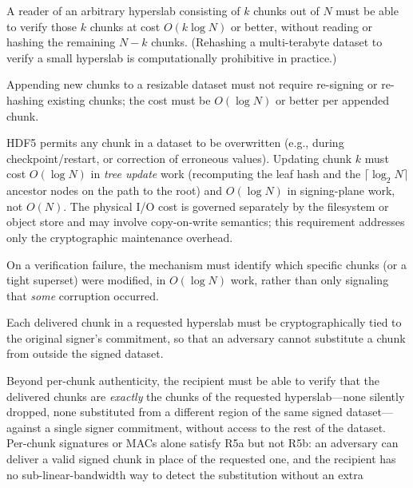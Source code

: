 \documentclass[11pt]{article}
\begin{document}
\begin{description}[nosep]
  \item[R1: Sub-dataset partial verification.]
    A reader of an arbitrary hyperslab consisting of $k$ chunks out of $N$
    must be able to verify those $k$ chunks at cost $O(k\log N)$ or better,
    without reading or hashing the remaining $N-k$ chunks. (Rehashing a
    multi-terabyte dataset to verify a small hyperslab is computationally
    prohibitive in practice.)
  \item[R2: Incremental extension.]
    Appending new chunks to a resizable dataset must not require re-signing
    or re-hashing existing chunks; the cost must be $O(\log N)$ or better
    per appended chunk.
  \item[R3: In-place chunk update.]
    HDF5 permits any chunk in a dataset to be overwritten (e.g., during
    checkpoint/restart, or correction of erroneous values). Updating chunk
    $k$ must cost $O(\log N)$ in \emph{tree update} work (recomputing the
    leaf hash and the $\lceil\log_2 N\rceil$ ancestor nodes on the path to
    the root) and $O(\log N)$ in signing-plane work, not $O(N)$.  The
    physical I/O cost is governed separately by the filesystem or object store
    and may involve copy-on-write semantics; this requirement addresses only
    the cryptographic maintenance overhead.
  \item[R4: Tamper localization.]
    On a verification failure, the mechanism must identify which specific
    chunks (or a tight superset) were modified, in $O(\log N)$ work, rather
    than only signaling that \emph{some} corruption occurred.
  \item[R5a: Per-chunk authenticity.]
    Each delivered chunk in a requested hyperslab must be cryptographically
    tied to the original signer's commitment, so that an adversary cannot
    substitute a chunk from outside the signed dataset.
  \item[R5b: Coverage and completeness proof.]
    Beyond per-chunk authenticity, the recipient must be able to verify that
    the delivered chunks are \emph{exactly} the chunks of the requested
    hyperslab---none silently dropped, none substituted from a different
    region of the same signed dataset---against a single signer commitment,
    without access to the rest of the dataset. Per-chunk signatures or MACs
    alone satisfy R5a but not R5b: an adversary can deliver a valid signed
    chunk in place of the requested one, and the recipient has no
    sub-linear-bandwidth way to detect the substitution without an extra

\end{description}
\end{document}
